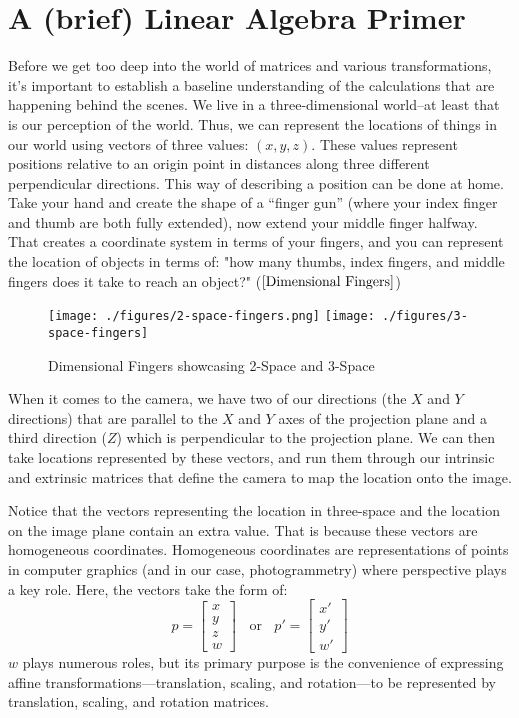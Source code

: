 \documentclass[
    12pt,
    twoside,
    bibstyle=chicago,
    headerstyle=uppercase,
	bibfile=thesis.bib
]{reedthesis}
\begin{document}
\section{A (brief) Linear Algebra Primer}
Before we get too deep into the world of matrices and various transformations, it's important to establish a baseline understanding of the calculations that are happening behind the scenes. We live in a three-dimensional world--at least that is our perception of the world. Thus, we can represent the locations of things in our world using vectors of three values: $(x, y, z)$. These values represent positions relative to an origin point in distances along three different perpendicular directions. This way of describing a position can be done at home. Take your hand and create the shape of a “finger gun” (where your index finger and thumb are both fully extended), now extend your middle finger halfway. That creates a coordinate system in terms of your fingers, and you can represent the location of objects in terms of: "how many thumbs, index fingers, and middle fingers does it take to reach an object?" ($\ref{Dimensional Fingers}$)

\begin{figure}[b]
	   
	       \centering
	    
	    \texttt{[image: ./figures/2-space-fingers.png]} 
		\hfill	    
	    \texttt{[image: ./figures/3-space-fingers]}
	     \caption{Dimensional Fingers showcasing 2-Space and 3-Space}
	 \label{Dimensional Fingers}
	\end{figure}

When it comes to the camera, we have two of our directions (the $X$ and $Y$ directions) that are parallel to the $X$ and $Y$ axes of the projection plane and a third direction ($Z$) which is perpendicular to the projection plane. We can then take locations represented by these vectors, and run them through our intrinsic and extrinsic matrices that define the camera to map the location onto the image.

Notice that the vectors representing the location in three-space and the location on the image plane contain an extra value. That is because these vectors are homogeneous coordinates. Homogeneous coordinates are representations of points in computer graphics (and in our case, photogrammetry) where perspective plays a key role. Here, the vectors take the form of: \[p = \begin{bmatrix}x\\y\\z\\w\end{bmatrix}\;\; \text{ or }\;\; p' = \begin{bmatrix}x'\\y'\\w'\end{bmatrix}\] $w$ plays numerous roles, but its primary purpose is the convenience of expressing affine transformations---translation, scaling, and rotation---to be represented by translation, scaling, and rotation matrices.
\end{document}
